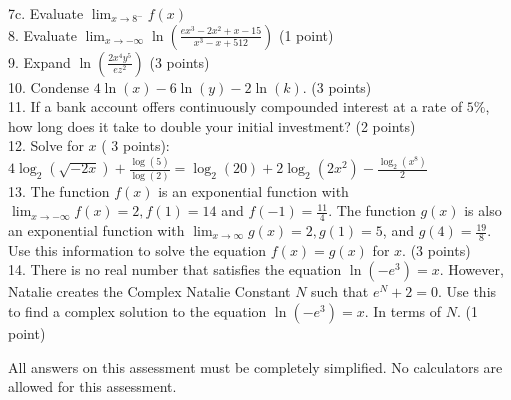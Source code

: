 \documentclass[10pt]{article}
\begin{document}
7c. Evaluate $\lim _{x \rightarrow 8^{-}} f(x)$\\
8. Evaluate $\lim _{x \rightarrow-\infty} \ln \left(\frac{e x^{3}-2 x^{2}+x-15}{x^{3}-x+512}\right)$ (1 point)\\
9. Expand $\ln \left(\frac{2 x^{4} y^{5}}{e z^{2}}\right)$ (3 points)\\
10. Condense $4 \ln (x)-6 \ln (y)-2 \ln (k)$. (3 points)\\
11. If a bank account offers continuously compounded interest at a rate of $5 \%$, how long does it take to double your initial investment? (2 points)\\
12. Solve for $x$ ( 3 points): $4 \log _{2}(\sqrt{-2 x})+\frac{\log (5)}{\log (2)}=\log _{2}(20)+2 \log _{2}\left(2 x^{2}\right)-\frac{\log _{2}\left(x^{8}\right)}{2}$\\
13. The function $f(x)$ is an exponential function with $\lim _{x \rightarrow-\infty} f(x)=2, f(1)=14$ and $f(-1)=\frac{11}{4}$. The function $g(x)$ is also an exponential function with $\lim _{x \rightarrow \infty} g(x)=2, g(1)=5$, and $g(4)=\frac{19}{8}$. Use this information to solve the equation $f(x)=g(x)$ for $x$. (3 points)\\
14. There is no real number that satisfies the equation $\ln \left(-e^{3}\right)=x$. However, Natalie creates the Complex Natalie Constant $N$ such that $e^{N}+2=0$. Use this to find a complex solution to the equation $\ln \left(-e^{3}\right)=x$. In terms of $N$. (1 point)

All answers on this assessment must be completely simplified. No calculators are allowed for this assessment.
\end{document}
